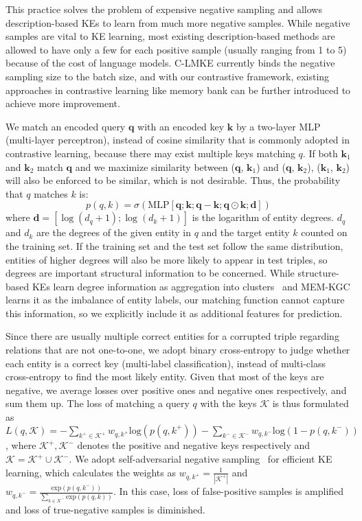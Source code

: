 \documentclass{article}
\newcommand{\wxt}[1]{{#1}}
\begin{document}
This practice solves the problem of expensive negative sampling and allows description-based KEs to learn from much more negative samples.
While negative samples are vital to KE learning, most existing description-based methods are allowed to have only a few for each positive sample (usually ranging from 1 to 5) because of the cost of language models. 
C-LMKE currently binds the negative sampling size to the batch size,
and with our contrastive framework, existing approaches in contrastive learning like memory bank can be further introduced to achieve more improvement.

We match an encoded query $\textbf{q}$ with an encoded key $\textbf{k}$ by a two-layer MLP (multi-layer perceptron), instead of cosine similarity that is commonly adopted in contrastive learning, because there may exist multiple keys matching $q$.
If both $\textbf{k}_1$ and $\textbf{k}_2$ match $\textbf{q}$ and we maximize similarity between ($\textbf{q}$, $\textbf{k}_1$) and ($\textbf{q}$, $\textbf{k}_2$), ($\textbf{k}_1$, $\textbf{k}_2$) will also be enforced to be similar, which is not desirable. 
Thus, the probability that $q$ matches $k$ is:
\begin{equation}
    p(q, k)= \sigma(\text{MLP}[\textbf{q}; \textbf{k}; \textbf{q}-\textbf{k}; \textbf{q}\odot\textbf{k}; \textbf{d}])
\end{equation}
where  $\textbf{d}=[\log{(d_{q}+1)}; \log{(d_{k}+1)}]$ is the logarithm of entity degrees.
$d_{q}$ and $d_{k}$ are the degrees of the given entity in $q$ and the target entity $k$ counted on the training set. 
If the training set and the test set follow the same distribution, 
entities of higher degrees will also be more likely to appear in test triples,
so degrees are important structural information to be concerned.
While structure-based KEs learn degree information as aggregation into clusters~\cite{pei2019semi} and MEM-KGC learns it as the imbalance of entity labels, our matching function cannot capture this information, so we explicitly include it as additional features for prediction. 

Since there are usually multiple correct entities for a corrupted triple regarding relations that are not one-to-one, 
we adopt binary cross-entropy to judge whether each entity is a correct key (multi-label classification), instead of multi-class cross-entropy to find the most likely entity. 
Given that most of the keys are negative, we \wxt{average} losses over positive ones and negative ones respectively, and sum them up. 
\wxt{
The loss of matching a query $q$ with the keys $\mathcal{K}$ is thus formulated as 
$L(q, \mathcal{K}) = -\sum_{k^+\in\mathcal{K}^+} w_{q,k^+}\text{log}(p(q,k^+))-\sum_{k^-\in\mathcal{K}^-}w_{q,k^-}\text{log}(1-p(q,k^-))$, where $\mathcal{K}^+,\mathcal{K}^-$ denotes the positive and negative keys respectively and $\mathcal{K}=\mathcal{K}^+\cup\mathcal{K}^-$. 
We adopt self-adversarial negative sampling~\cite{sun2019rotate} for efficient KE learning, which calculates the weights as $w_{q,k^+}=\frac{1}{|\mathcal{K}^{+}|}$ and $w_{q,k^-}=\frac{\text{exp}(p(q,k^-))}{\sum_{k\in\mathcal{K}^-}\text{exp}(p(q,k))}$. In this case,  loss of false-positive samples is amplified and loss of true-negative samples is diminished.
}
\end{document}
